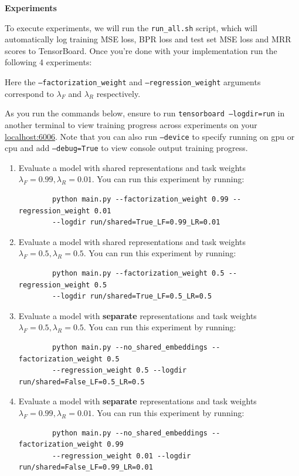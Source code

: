 \item {\bf Experiments}

To execute experiments, we will run the \texttt{run\_all.sh} script, which will automatically log training MSE loss, BPR loss and test set MSE loss and MRR scores to TensorBoard. Once you're done with your implementation run the following 4 experiments:

Here the \texttt{--factorization\_weight} and \texttt{--regression\_weight} arguments correspond to $\lambda_F$ and  $\lambda_R$ respectively.

As you run the commands below, ensure to run \texttt{tensorboard --logdir=run} in another terminal to view training progress across experiments on your \href{http://localhost:6006/}{localhost:6006}. Note that you can also run \texttt{--device} to specify running on gpu or cpu and add \texttt{--debug=True} to view console output training progress.

\begin{enumerate}[I]
    \item Evaluate a model with shared representations and task weights $\lambda_F=0.99, \lambda_R=0.01$. You can run this experiment by running:
    
    \begin{verbatim}
        python main.py --factorization_weight 0.99 --regression_weight 0.01 
        --logdir run/shared=True_LF=0.99_LR=0.01
    \end{verbatim}    
    
    \item Evaluate a model with shared representations and task weights $\lambda_F=0.5, \lambda_R=0.5$. You can run this experiment by running:    

    \begin{verbatim}
        python main.py --factorization_weight 0.5 --regression_weight 0.5
        --logdir run/shared=True_LF=0.5_LR=0.5
    \end{verbatim}
        
    \item Evaluate a model with \textbf{separate} representations and task weights $\lambda_F=0.5, \lambda_R=0.5$. You can run this experiment by running:    

    \begin{verbatim}
        python main.py --no_shared_embeddings --factorization_weight 0.5
        --regression_weight 0.5 --logdir run/shared=False_LF=0.5_LR=0.5
    \end{verbatim}
        
    \item Evaluate a model with \textbf{separate} representations and task weights $\lambda_F=0.99, \lambda_R=0.01$. You can run this experiment by running:    

    \begin{verbatim}
        python main.py --no_shared_embeddings --factorization_weight 0.99
        --regression_weight 0.01 --logdir run/shared=False_LF=0.99_LR=0.01
    \end{verbatim} 
        
\end{enumerate}

